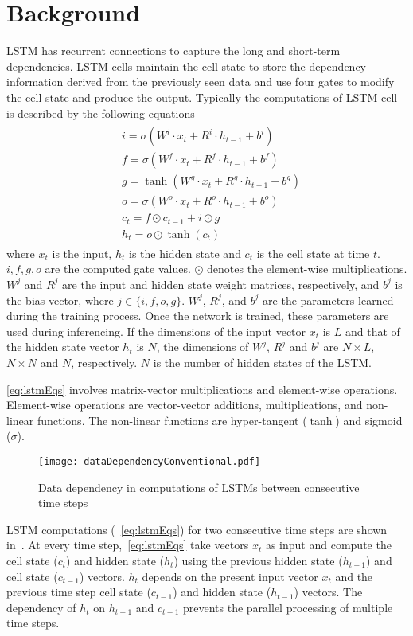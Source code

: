 \section{Background}
LSTM has recurrent connections to capture the long and short-term dependencies. LSTM cells maintain the cell state to store the dependency information derived from the previously seen data and use four gates to modify the cell state and produce the output. Typically the computations of LSTM cell is described by the following equations
\begin{align}\label{eq:lstmEqs}
	\begin{split}
		&i{=}{\sigma}(W^i{\cdot}x_t{+}R^i{\cdot}h_{t-1}{+}b^i)\\
		&f{=}{\sigma}(W^f{\cdot}x_t{+}R^f{\cdot}h_{t-1}{+}b^f)\\
		&g{=}{\tanh}(W^g{\cdot}x_t{+}R^g{\cdot}h_{t-1}{+}b^g)\\
		&o{=}{\sigma}(W^o{\cdot}x_t{+}R^o{\cdot}h_{t-1}{+}b^o)\\
		&c_{t}{=}f{\odot}c_{t-1}{+}i{\odot}g\\
		&h_{t}{=}o{\odot}{\tanh}(c_t)
	\end{split}	
\end{align}
where $x_t$ is the input, $h_t$ is the hidden state and $c_t$ is the cell state at time $t$. $i,f,g,o$ are the computed gate values. $\odot$ denotes the element-wise multiplications. $W^j$ and $R^j$ are the input and hidden state weight matrices, respectively, and $b^j$ is the bias vector, where $j\in\{i,f,o,g\}$. $W^j$, $R^j$, and $b^j$ are the parameters learned during the training process. Once the network is trained, these parameters are used during inferencing. 
If the dimensions of the input vector $x_t$ is $L$ and that of the hidden state vector $h_t$ is $N$, the dimensions of $W^j$, $R^j$ and $b^j$ are $N{\times}L$, $N{\times}N$ and $N$, respectively. $N$ is the number of hidden states of the LSTM. 

\eqref{eq:lstmEqs} involves matrix-vector multiplications and element-wise operations. Element-wise operations are vector-vector additions, multiplications, and non-linear functions. The non-linear functions are hyper-tangent ($\tanh$) and sigmoid ($\sigma$).
\begin{figure}[!htb]
	\centerline{\texttt{[image: dataDependencyConventional.pdf]}}
	\caption{Data dependency in computations of LSTMs between consecutive time steps}
	\label{fig:lstmComputationConv}
\end{figure}
LSTM computations (~\eqref{eq:lstmEqs}) for two consecutive time steps are shown in~. At every time step,~\eqref{eq:lstmEqs} take vectors $x_t$ as input and compute the cell state ($c_t$) and hidden state ($h_t$) using the previous hidden state ($h_{t-1}$) and cell state ($c_{t-1}$) vectors. $h_t$ depends on the present input vector $x_t$ and the previous time step cell state ($c_{t-1}$) and hidden state ($h_{t-1}$) vectors. The dependency of $h_t$ on $h_{t-1}$ and $c_{t-1}$ prevents the parallel processing of multiple time steps. 


